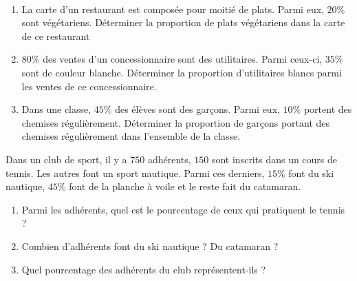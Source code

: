 \documentclass[11pt]{article}
\begin{document}
\begin{exo}~
\begin{enumerate}
  \item La carte d’un restaurant est composée pour moitié de plats. Parmi eux,
    $20\%$ sont végétariens. Déterminer la proportion de plats végétariens dans la carte de ce restaurant
  \item $80\%$ des ventes d’un concessionnaire sont des utilitaires. Parmi
    ceux-ci, $35\%$ sont de couleur blanche. Déterminer la proportion d’utilitaires blancs parmi les ventes de ce concessionnaire.
  \item Dans une classe, $45\%$ des élèves sont des garçons. Parmi eux, $10\%$
    portent des chemises régulièrement. Déterminer la proportion de garçons
    portant des chemises régulièrement dans l’ensemble de la classe.
\end{enumerate}
\end{exo}

\begin{exo}
Dans un club de sport, il y a $750$ adhérents, $150$
sont inscrits dans un cours de tennis. Les autres font un sport nautique. Parmi
ces derniers, $15\%$ font du ski nautique, $45\%$ font de la planche à voile et le reste fait du catamaran.
\begin{enumerate}
  \item Parmi les adhérents, quel est le pourcentage de ceux qui pratiquent le tennis ?
  \item Combien d’adhérents font du ski nautique ? Du catamaran ?
  \item Quel pourcentage des adhérents du club représentent-ils ?
\end{enumerate}
\end{exo}
\end{document}
